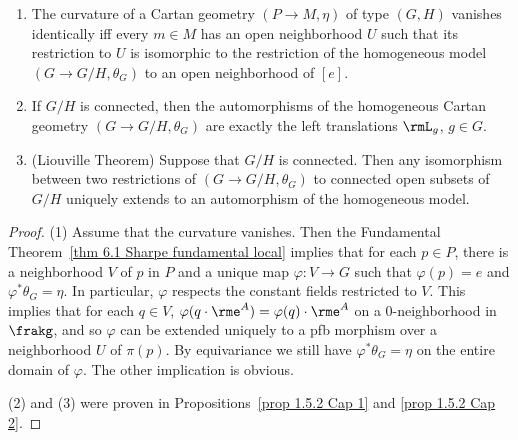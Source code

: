 \begin{prop}\label{prop 1.5.2 Cap}
    \begin{enumerate}[label=(\arabic*)]
        \item The curvature of a Cartan geometry $(P\to M,\eta)$ of type $(G,H)$ vanishes identically iff every $m\in M$ has an open neighborhood $U$ such that its restriction to $U$ is isomorphic to the restriction of the homogeneous model $(G\to G\slash H,\theta_G)$ to an open neighborhood of $[e]$.
        \item If $G\slash H$ is connected, then the automorphisms of the homogeneous Cartan geometry $(G\to G\slash H,\theta_G)$ are exactly the left translations $\rmL_g$, $g\in G$.
        \item (Liouville Theorem) Suppose that $G\slash H$ is connected. Then any isomorphism between two restrictions of $(G\to G\slash H,\theta_G)$ to connected open subsets of $G\slash H$ uniquely extends to an automorphism of the homogeneous model.
    \end{enumerate}
\end{prop}
\begin{proof}
    (1) Assume that the curvature vanishes. Then the Fundamental Theorem~\ref{thm 6.1 Sharpe fundamental local} implies that for each $p\in P$, there is a neighborhood $V$ of $p$ in $P$ and a unique map $\varphi:V\to G$ such that $\varphi(p)=e$ and $\varphi^\ast\theta_G=\eta$. In particular, $\varphi$ respects the constant fields restricted to $V$. This implies that for each $q\in V$, $\varphi(q\cdot \rme^{A})=\varphi(q)\cdot \rme^{A}$ on a $0$-neighborhood in $\frakg$, and so $\varphi$ can be extended uniquely to a \gls{pfb} morphism over a neighborhood $U$ of $\pi(p)$. By equivariance we still have $\varphi^\ast\theta_G=\eta$ on the entire domain of $\varphi$. The other implication is obvious.

    (2) and (3) were proven in Propositions~\ref{prop 1.5.2 Cap 1} and \ref{prop 1.5.2 Cap 2}.
\end{proof}

